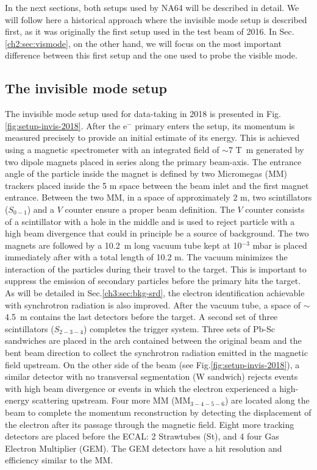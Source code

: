 In the next sections, both setups used by NA64 will be described in detail. We will follow here a historical approach where the invisible mode setup is described first, as it was originally the first setup used in the test beam of 2016. In Sec.\ref{ch2:sec:vismode}, on the other hand, we will focus on the most important difference between this first setup and the one used to probe the visible mode.


\subsection{The invisible mode setup}
\label{ch2:sec:invismode}

The invisible mode setup used for data-taking in 2018 is presented in Fig.\ref{fig:setup-invis-2018}. After the e$^-$ primary enters the setup, its momentum is measured precisely to provide an initial estimate of its energy. This is achieved using a magnetic spectrometer with an integrated field of $\sim 7$ \si{\tesla\meter} generated by two dipole magnets \cite{mbpl} placed in series along the primary beam-axis. The entrance angle of the particle inside the magnet is defined by two Micromegas (MM) trackers placed inside the 5 m space between the beam inlet and the first magnet entrance. Between the two MM, in a space of approximately 2 m, two scintillators ($S_{0-1}$) and a $V$ counter ensure a proper beam definition. The $V$ counter consists of a scintillator with a hole in the middle and is used to reject particle with a high beam divergence that could in principle be a source of background. The two magnets are followed by a \SI{10.2}{\meter} long vacuum tube kept at 10$^{-3}$ \si{mbar} is placed immediately after with a total length of 10.2 \si{m}. The vacuum minimizes the interaction of the particles during their travel to the target. This is important to suppress the emission of secondary particles before the primary hits the target. As will be detailed in Sec.\ref{ch3:sec:bkg-srd}, the electron identification achievable with synchrotron radiation is also improved. After the vacuum tube, a space of $\sim$ \SI{4.5}{\meter} contains the last detectors before the target. A second set of three scintillators ($S_{2-3-4}$) completes the trigger system. Three sets of Pb-Sc sandwiches are placed in the arch contained between the original beam and the bent beam direction to collect the synchrotron radiation emitted in the magnetic field upstream. On the other side of the beam (see Fig.\ref{fig:setup-invis-2018}), a similar detector with no transversal segmentation (W sandwich) rejects events with high beam divergence or events in which the electron experienced a high-energy scattering upstream. Four more MM (MM$_{3-4-5-6}$) are located along the beam to complete the momentum reconstruction by detecting the displacement of the electron after its passage through the magnetic field. Eight more tracking detectors are placed before the ECAL: 2 Strawtubes (St), and 4 four Gas Electron Multiplier (GEM). The GEM detectors have a hit resolution and efficiency similar to the MM.
